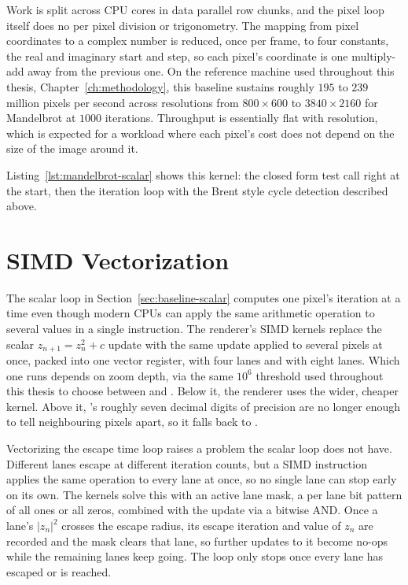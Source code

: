\documentclass{ftndiplomski}
\begin{document}
Work is split across CPU cores in data parallel row chunks, and the pixel loop itself does no per
pixel division or trigonometry. The mapping from pixel coordinates to a complex number is reduced,
once per frame, to four constants, the real and imaginary start and step, so each pixel's
coordinate is one multiply-add away from the previous one. On the reference machine used throughout
this thesis, Chapter~\ref{ch:methodology}, this baseline sustains roughly $195$ to $239$ million
pixels per second across resolutions from $800\times600$ to $3840\times2160$ for Mandelbrot at
$1000$ iterations. Throughput is essentially flat with resolution, which is expected for a workload
where each pixel's cost does not depend on the size of the image around it.

Listing~\ref{lst:mandelbrot-scalar} shows this kernel: the closed form test call right at the
start, then the iteration loop with the Brent style cycle detection described above.

\noindent\begin{minipage}{\linewidth}

\end{minipage}

\section{SIMD Vectorization}
\label{sec:simd}

The scalar loop in Section~\ref{sec:baseline-scalar} computes one pixel's iteration at a time even
though modern CPUs can apply the same arithmetic operation to several values in a single
instruction. The renderer's SIMD kernels replace the scalar $z_{n+1}=z_n^2+c$ update with the same
update applied to several pixels at once, packed into one vector register,  with four
 lanes and  with eight  lanes. Which one runs depends on zoom depth,
via the same $10^6$ threshold used throughout this thesis to choose between  and
. Below it, the renderer uses the wider, cheaper  kernel. Above it,
's roughly seven decimal digits of precision are no longer enough to tell neighbouring
pixels apart, so it falls back to .

Vectorizing the escape time loop raises a problem the scalar loop does not have. Different lanes
escape at different iteration counts, but a SIMD instruction applies the same operation to every
lane at once, so no single lane can stop early on its own. The kernels solve this with an active
lane mask, a per lane bit pattern of all ones or all zeros, combined with the update via a bitwise
AND. Once a lane's $|z_n|^2$ crosses the escape radius, its escape iteration and value of $z_n$ are
recorded and the mask clears that lane, so further updates to it become no-ops while the remaining
lanes keep going. The loop only stops once every lane has escaped or  is reached.
\end{document}
